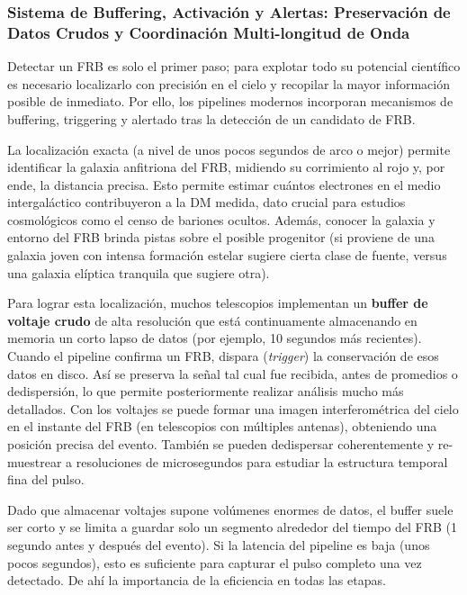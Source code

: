 \subsubsection{Sistema de Buffering, Activación y Alertas: Preservación de Datos Crudos y Coordinación Multi-longitud de Onda}

Detectar un FRB es solo el primer paso; para explotar todo su potencial científico es necesario localizarlo con precisión en el cielo y recopilar la mayor información posible de inmediato. Por ello, los pipelines modernos incorporan mecanismos de buffering, triggering y alertado tras la detección de un candidato de FRB.

La localización exacta (a nivel de unos pocos segundos de arco o mejor) permite identificar la galaxia anfitriona del FRB, midiendo su corrimiento al rojo y, por ende, la distancia precisa. Esto permite estimar cuántos electrones en el medio intergaláctico contribuyeron a la DM medida, dato crucial para estudios cosmológicos como el censo de bariones ocultos. Además, conocer la galaxia y entorno del FRB brinda pistas sobre el posible progenitor (si proviene de una galaxia joven con intensa formación estelar sugiere cierta clase de fuente, versus una galaxia elíptica tranquila que sugiere otra).

Para lograr esta localización, muchos telescopios implementan un \textbf{buffer de voltaje crudo} de alta resolución que está continuamente almacenando en memoria un corto lapso de datos (por ejemplo, 10 segundos más recientes). Cuando el pipeline confirma un FRB, dispara (\textit{trigger}) la conservación de esos datos en disco. Así se preserva la señal tal cual fue recibida, antes de promedios o dedispersión, lo que permite posteriormente realizar análisis mucho más detallados. Con los voltajes se puede formar una imagen interferométrica del cielo en el instante del FRB (en telescopios con múltiples antenas), obteniendo una posición precisa del evento. También se pueden dedispersar coherentemente y re-muestrear a resoluciones de microsegundos para estudiar la estructura temporal fina del pulso.

Dado que almacenar voltajes supone volúmenes enormes de datos, el buffer suele ser corto y se limita a guardar solo un segmento alrededor del tiempo del FRB (1 segundo antes y después del evento). Si la latencia del pipeline es baja (unos pocos segundos), esto es suficiente para capturar el pulso completo una vez detectado. De ahí la importancia de la eficiencia en todas las etapas.

